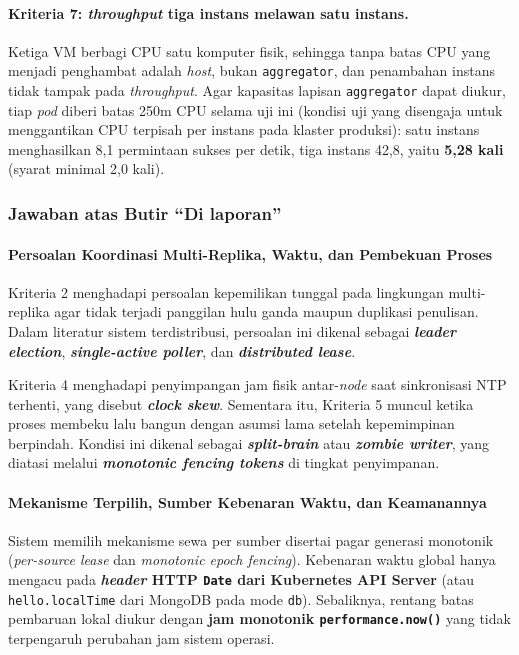 \paragraph*{Kriteria 7: \textit{throughput} tiga instans melawan satu instans.}
Ketiga VM berbagi CPU satu komputer fisik, sehingga tanpa batas CPU yang menjadi penghambat adalah \textit{host}, bukan \texttt{aggregator}, dan penambahan instans tidak tampak pada \textit{throughput}. Agar kapasitas lapisan \texttt{aggregator} dapat diukur, tiap \textit{pod} diberi batas 250m CPU selama uji ini (kondisi uji yang disengaja untuk menggantikan CPU terpisah per instans pada klaster produksi): satu instans menghasilkan 8,1 permintaan sukses per detik, tiga instans 42,8, yaitu \textbf{5,28 kali} (syarat minimal 2,0 kali).

\subsubsection{Jawaban atas Butir ``Di laporan''}

\paragraph*{Persoalan Koordinasi Multi-Replika, Waktu, dan Pembekuan Proses}
Kriteria 2 menghadapi persoalan kepemilikan tunggal pada lingkungan multi-replika agar tidak terjadi panggilan hulu ganda maupun duplikasi penulisan. Dalam literatur sistem terdistribusi, persoalan ini dikenal sebagai \textbf{\textit{leader election}}, \textbf{\textit{single-active poller}}, dan \textbf{\textit{distributed lease}}.

Kriteria 4 menghadapi penyimpangan jam fisik antar-\textit{node} saat sinkronisasi NTP terhenti, yang disebut \textbf{\textit{clock skew}}. Sementara itu, Kriteria 5 muncul ketika proses membeku lalu bangun dengan asumsi lama setelah kepemimpinan berpindah. Kondisi ini dikenal sebagai \textbf{\textit{split-brain}} atau \textbf{\textit{zombie writer}}, yang diatasi melalui \textbf{\textit{monotonic fencing tokens}} di tingkat penyimpanan.

\paragraph*{Mekanisme Terpilih, Sumber Kebenaran Waktu, dan Keamanannya}
Sistem memilih mekanisme sewa per sumber disertai pagar generasi monotonik (\textit{per-source lease} dan \textit{monotonic epoch fencing}). Kebenaran waktu global hanya mengacu pada \textbf{\textit{header} HTTP \texttt{Date} dari Kubernetes API Server} (atau \texttt{hello.localTime} dari MongoDB pada mode \texttt{db}). Sebaliknya, rentang batas pembaruan lokal diukur dengan \textbf{jam monotonik \texttt{performance.now()}} yang tidak terpengaruh perubahan jam sistem operasi.

